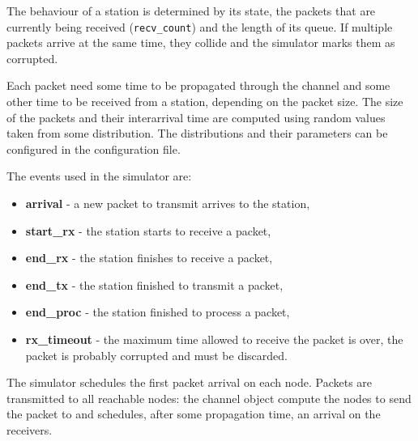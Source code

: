 The behaviour of a station is determined by its state, the packets that are currently being received (\texttt{recv\_count}) and the length of its queue.
If multiple packets arrive at the same time, they collide and the simulator marks them as corrupted.

Each packet need some time to be propagated through the channel and some other time to be received from a station, depending on the packet size.
The size of the packets and their interarrival time are computed using random values taken from some distribution.
The distributions and their parameters can be configured in the configuration file.

The events used in the simulator are:

\begin{itemize}
    \item \textbf{arrival} - a new packet to transmit arrives to the station,
    \item \textbf{start\_rx} - the station starts to receive a packet,
    \item \textbf{end\_rx} - the station finishes to receive a packet,
    \item \textbf{end\_tx} - the station finished to transmit a packet,
    \item \textbf{end\_proc} - the station finished to process a packet,
    \item \textbf{rx\_timeout} - the maximum time allowed to receive the packet is over, the packet is probably corrupted and must be discarded.
\end{itemize}

The simulator schedules the first packet arrival on each node.
Packets are transmitted to all reachable nodes: the channel object compute the nodes to send the packet to and schedules, after some propagation time, an arrival on the receivers.

